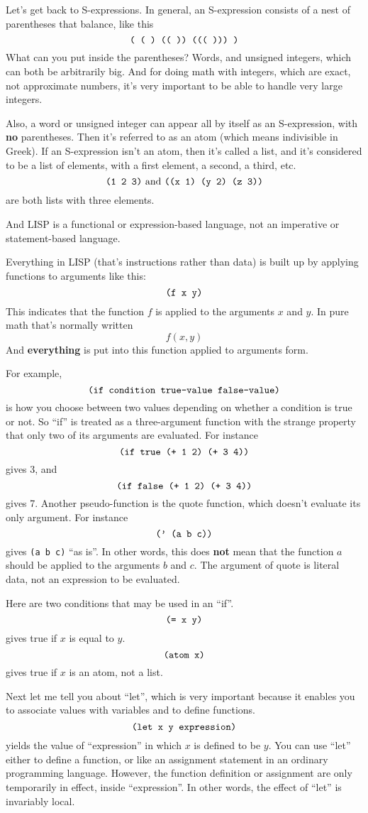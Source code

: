 \documentclass[12pt]{book}
\begin{document}
Let's get back to S-expressions. In general, an S-expression consists of a nest
of parentheses that balance, like this
\[\mbox{\texttt{
 (  (  ) ((  )) (((  )))  )
}}\]
What can you put inside the parentheses? Words, and unsigned integers, which can both be
arbitrarily big.  And for doing math with integers, which are exact, not approximate numbers, it's
very important to be able to handle very large integers.
 
Also, a word or unsigned integer can appear all by itself as an S-expression, with \textbf{no}
parentheses.   Then it's referred to as an atom (which means indivisible in Greek).
If an S-expression isn't an atom, then it's called a list, and it's considered to be a list
of elements, with a first element, a second, a third, etc.
\[
    \mbox{\texttt{(1 2 3)} and \texttt{((x 1) (y 2) (z 3))}}
\]
are both lists with three elements.
 
And LISP is a functional or expression-based language, not an imperative
or statement-based language.
 
Everything in LISP 
(that's instructions rather than data)
is built up by applying 
functions to arguments like this:
\[\mbox{\texttt{
 (f x y)
}}\]
This indicates that the function $f$ is applied to the arguments $x$ and $y$. 
In pure math that's normally written
\[
 f(x,y)
\] 
And \textbf{everything} is put into this function applied to arguments form.
 
For example,
\[\mbox{\texttt{
 (if condition true-value false-value)
}}\]
is how you choose between two values depending on whether a condition is true or not.
So ``if'' is treated as a three-argument function with the strange property that only
two of its arguments are evaluated.
For instance
\[\mbox{\texttt{
 (if true (+ 1 2) (+ 3 4))
}}\]
gives 3, and
\[\mbox{\texttt{
 (if false (+ 1 2) (+ 3 4))
}}\]
gives 7.
Another pseudo-function is the quote function, which doesn't evaluate its only argument.
For instance
\[\mbox{\texttt{
 (' (a b c))
}}\]
gives \texttt{(a b c)} ``as is''.
In other words, this does \textbf{not} mean that the function $a$ should
be applied to the arguments $b$ and $c$.
The argument of quote is literal data, not an expression to be evaluated.
 
Here are two conditions that may be used in an ``if''.
\[\mbox{\texttt{
 (= x y)
}}\]
gives true if $x$ is equal to $y$.
\[\mbox{\texttt{
 (atom x)
}}\]
gives true if $x$ is an atom, not a list.
 
Next let me tell you about ``let'',
which is very important because it enables you to associate values with variables and 
to define functions.
\[\mbox{\texttt{
 (let x y expression)
}}\]
yields the value of ``expression'' in which $x$ is defined to be $y$.
You can use ``let'' either to define a function, or like an assignment
statement in an ordinary programming language.  However, the function
definition or assignment are only temporarily in effect, inside ``expression''.
In other words, the effect of ``let'' is invariably local.
 
\end{document}
